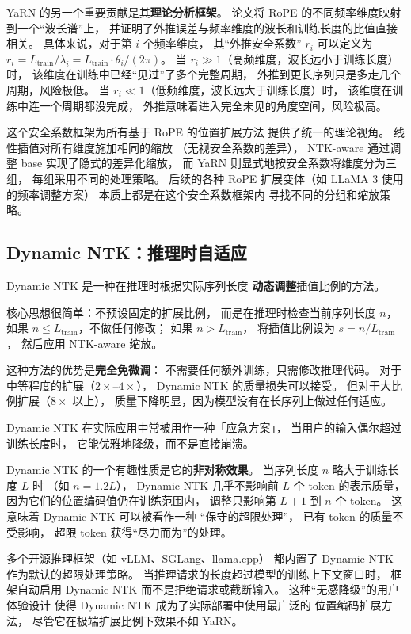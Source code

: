YaRN 的另一个重要贡献是其\textbf{理论分析框架}。
论文将 RoPE 的不同频率维度映射到一个“波长谱”上，
并证明了外推误差与频率维度的波长和训练长度的比值直接相关。
具体来说，对于第 $i$ 个频率维度，
其“外推安全系数” $r_i$ 可以定义为
$r_i = L_{\text{train}} / \lambda_i = L_{\text{train}} \cdot \theta_i / (2\pi)$。
当 $r_i \gg 1$（高频维度，波长远小于训练长度）时，
该维度在训练中已经“见过”了多个完整周期，
外推到更长序列只是多走几个周期，风险极低。
当 $r_i \ll 1$（低频维度，波长远大于训练长度）时，
该维度在训练中连一个周期都没完成，
外推意味着进入完全未见的角度空间，风险极高。

这个安全系数框架为所有基于 RoPE 的位置扩展方法
提供了统一的理论视角。
线性插值对所有维度施加相同的缩放
（无视安全系数的差异），
NTK-aware 通过调整 base 实现了隐式的差异化缩放，
而 YaRN 则显式地按安全系数将维度分为三组，
每组采用不同的处理策略。
后续的各种 RoPE 扩展变体（如 LLaMA 3 使用的频率调整方案）
本质上都是在这个安全系数框架内
寻找不同的分组和缩放策略。

\subsection{Dynamic NTK：推理时自适应}

Dynamic NTK 是一种在推理时根据实际序列长度
\textbf{动态调整}插值比例的方法。

核心思想很简单：不预设固定的扩展比例，
而是在推理时检查当前序列长度 $n$，
如果 $n \leq L_{\text{train}}$，不做任何修改；
如果 $n > L_{\text{train}}$，
将插值比例设为 $s = n / L_{\text{train}}$，
然后应用 NTK-aware 缩放。

这种方法的优势是\textbf{完全免微调}：
不需要任何额外训练，只需修改推理代码。
对于中等程度的扩展（$2\times$--$4\times$），
Dynamic NTK 的质量损失可以接受。
但对于大比例扩展（$8\times$ 以上），
质量下降明显，因为模型没有在长序列上做过任何适应。

Dynamic NTK 在实际应用中常被用作一种「应急方案」，
当用户的输入偶尔超过训练长度时，
它能优雅地降级，而不是直接崩溃。

Dynamic NTK 的一个有趣性质是它的\textbf{非对称效果}。
当序列长度 $n$ 略大于训练长度 $L$ 时
（如 $n = 1.2L$），
Dynamic NTK 几乎不影响前 $L$ 个 token 的表示质量，
因为它们的位置编码值仍在训练范围内，
调整只影响第 $L+1$ 到 $n$ 个 token。
这意味着 Dynamic NTK 可以被看作一种
“保守的超限处理”，
已有 token 的质量不受影响，
超限 token 获得“尽力而为”的处理。

多个开源推理框架（如 vLLM、SGLang、llama.cpp）
都内置了 Dynamic NTK 作为默认的超限处理策略。
当推理请求的长度超过模型的训练上下文窗口时，
框架自动启用 Dynamic NTK 而不是拒绝请求或截断输入。
这种“无感降级”的用户体验设计
使得 Dynamic NTK 成为了实际部署中使用最广泛的
位置编码扩展方法，
尽管它在极端扩展比例下效果不如 YaRN。

